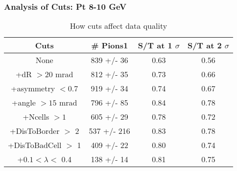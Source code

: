 \frame
{
\frametitle{Analysis of Cuts: Pt  8-10 GeV}
\begin{table}
\caption{How cuts affect data quality}
\centering
\begin{tabular}{c c c c}
\hline\hline
Cuts & \# Pions1 & S/T at 1 $\sigma$ & S/T at 2 $\sigma$ \\ [0.5ex]
\hline
None &  839 +/-   36 & 0.63 & 0.56 \\ %
+dR $> 20$ mrad &  812 +/-   35 & 0.73 & 0.66 \\ %
+asymmetry $< 0.7$ &  919 +/-   34 & 0.74 & 0.67 \\ %
+angle $> 15$ mrad &  796 +/-   85 & 0.84 & 0.78 \\ %
+Ncells $> 1$&  605 +/-   29 & 0.78 & 0.72 \\ %
+DisToBorder $>$ 2 &  537 +/-  216 & 0.83 & 0.78 \\ %
+DisToBadCell $>$ 1&  409 +/-   22 & 0.80 & 0.74 \\ %
+$0.1 < \lambda <$ 0.4 &  138 +/-   14 & 0.81 & 0.75 \\ %
[1ex]
\hline
\end{tabular}
\label{table:nonlin}
\end{table}
}
